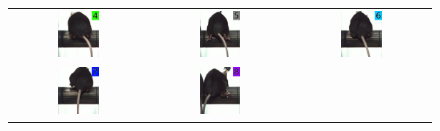 \begin{figure}[!htbp]
\begin{tabular}{ccc}
\includegraphics[width=0.32\textwidth]{figuras/expertos/videos/4.pdf} & \includegraphics[width=0.32\textwidth]{figuras/expertos/videos/5.pdf} & \includegraphics[width=0.32\textwidth]{figuras/expertos/videos/6.pdf} \\
\includegraphics[width=0.32\textwidth]{figuras/expertos/videos/7.pdf} &
\includegraphics[width=0.32\textwidth]{figuras/expertos/videos/8.pdf} &

\end{tabular}
\end{figure}
